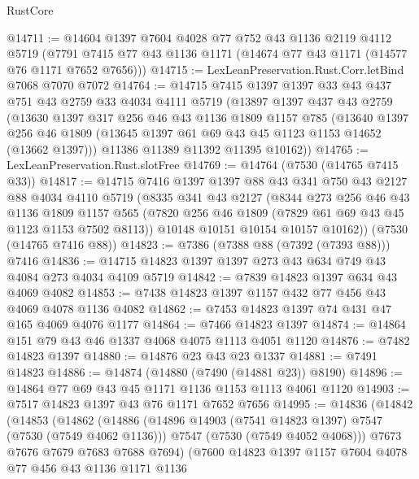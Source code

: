\begin{lexlean}{RustCore}
\begin{coremodule}
@14711 := @14604
    @1397
    @7604
    @4028
    @77
    @752
    @43
    @1136
    @2119
    @4112
    @5719
    (@7791 @7415 @77 @43 @1136 @1171 (@14674 @77 @43 @1171 (@14577 @76 @1171 @7652 @7656)))
@14715 := LexLeanPreservation.Rust.Corr.letBind @7068 @7070 @7072
@14764 := @14715
    @7415
    @1397
    @1397
    @33
    @43
    @437
    @751
    @43
    @2759
    @33
    @4034
    @4111
    @5719
    (@13897
      @1397
      @437
      @43
      @2759
      (@13630
        @1397
        @317
        @256
        @46
        @43
        @1136
        @1809
        @1157
        @785
        (@13640
          @1397
          @256
          @46
          @1809
          (@13645 @1397 @61 @69 @43 @45 @1123 @1153 @14652 (@13662 @1397)))
        @11386
        @11389
        @11392
        @11395
        @10162))
@14765 := LexLeanPreservation.Rust.slotFree
@14769 := @14764 (@7530 (@14765 @7415 @33))
@14817 := @14715
    @7416
    @1397
    @1397
    @88
    @43
    @341
    @750
    @43
    @2127
    @88
    @4034
    @4110
    @5719
    (@8335
      @341
      @43
      @2127
      (@8344
        @273
        @256
        @46
        @43
        @1136
        @1809
        @1157
        @565
        (@7820 @256 @46 @1809 (@7829 @61 @69 @43 @45 @1123 @1153 @7502 @8113))
        @10148
        @10151
        @10154
        @10157
        @10162))
    (@7530 (@14765 @7416 @88))
@14823 := @7386 (@7388 @88 (@7392 (@7393 @88))) @7416
@14836 := @14715 @14823 @1397 @1397 @273 @43 @634 @749 @43 @4084 @273 @4034 @4109 @5719
@14842 := @7839 @14823 @1397 @634 @43 @4069 @4082
@14853 := @7438 @14823 @1397 @1157 @432 @77 @456 @43 @4069 @4078 @1136 @4082
@14862 := @7453 @14823 @1397 @74 @431 @47 @165 @4069 @4076 @1177
@14864 := @7466 @14823 @1397
@14874 := @14864 @151 @79 @43 @46 @1337 @4068 @4075 @1113 @4051 @1120
@14876 := @7482 @14823 @1397
@14880 := @14876 @23 @43 @23 @1337
@14881 := @7491 @14823
@14886 := @14874 (@14880 (@7490 (@14881 @23)) @8190)
@14896 := @14864 @77 @69 @43 @45 @1171 @1136 @1153 @1113 @4061 @1120
@14903 := @7517 @14823 @1397 @43 @76 @1171 @7652 @7656
@14995 := @14836
    (@14842
      (@14853
        (@14862
          (@14886
            (@14896 @14903 (@7541 @14823 @1397) @7547 (@7530 (@7549 @4062 @1136)))
            @7547
            (@7530 (@7549 @4052 @4068)))
          @7673
          @7676
          @7679
          @7683
          @7688
          @7694)
        (@7600
          @14823
          @1397
          @1157
          @7604
          @4078
          @77
          @456
          @43
          @1136
          @1171
          @1136

\end{coremodule}
\end{lexlean}
